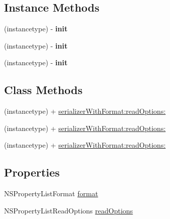 \subsection*{Instance Methods}
\begin{DoxyCompactItemize}
\item 
\mbox{\label{interface_a_f_property_list_response_serializer_aad70acbaa3acbb3c746a81ee0e2a61bd}} 
(instancetype) -\/ {\bfseries init}
\item 
\mbox{\label{interface_a_f_property_list_response_serializer_aad70acbaa3acbb3c746a81ee0e2a61bd}} 
(instancetype) -\/ {\bfseries init}
\item 
\mbox{\label{interface_a_f_property_list_response_serializer_aad70acbaa3acbb3c746a81ee0e2a61bd}} 
(instancetype) -\/ {\bfseries init}
\end{DoxyCompactItemize}
\subsection*{Class Methods}
\begin{DoxyCompactItemize}
\item 
(instancetype) + \mbox{\hyperlink{interface_a_f_property_list_response_serializer_a8998ba88f9bdae98d24a0e113ff6bbcf}{serializer\+With\+Format\+:read\+Options\+:}}
\item 
(instancetype) + \mbox{\hyperlink{interface_a_f_property_list_response_serializer_a8998ba88f9bdae98d24a0e113ff6bbcf}{serializer\+With\+Format\+:read\+Options\+:}}
\item 
(instancetype) + \mbox{\hyperlink{interface_a_f_property_list_response_serializer_a8998ba88f9bdae98d24a0e113ff6bbcf}{serializer\+With\+Format\+:read\+Options\+:}}
\end{DoxyCompactItemize}
\subsection*{Properties}
\begin{DoxyCompactItemize}
\item 
N\+S\+Property\+List\+Format \mbox{\hyperlink{interface_a_f_property_list_response_serializer_a616f88e89a24ca953c50e40f85177293}{format}}
\item 
N\+S\+Property\+List\+Read\+Options \mbox{\hyperlink{interface_a_f_property_list_response_serializer_a6913e8c365408a0800eb08b5396522f0}{read\+Options}}
\end{DoxyCompactItemize}


